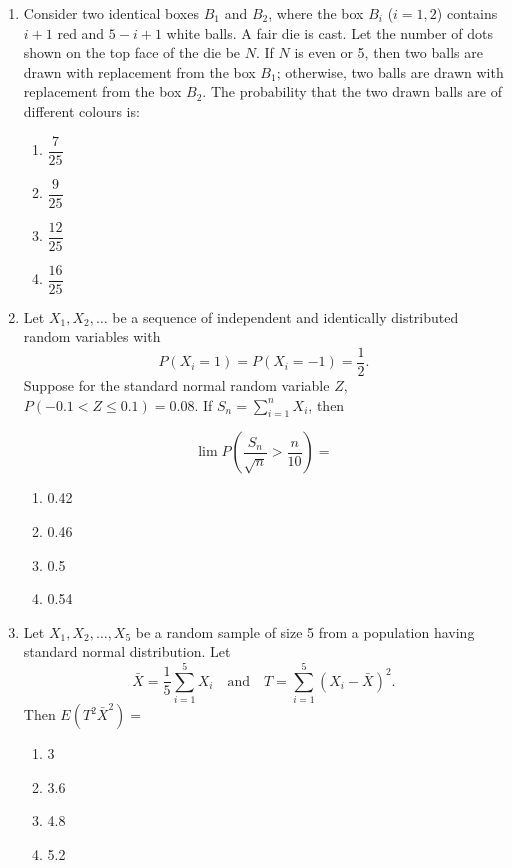 \documentclass[journal]{IEEEtran}
\numberwithin{equation}{enumi}
\numberwithin{figure}{enumi}
\begin{document}
\begin{enumerate}
\item Consider two identical boxes $B_1$ and $B_2$, where the box $B_i$ ($i=1,2$) contains $i+1$ red and $5 - i + 1$ white balls. A fair die is cast. Let the number of dots shown on the top face of the die be $N$. If $N$ is even or 5, then two balls are drawn with replacement from the box $B_1$; otherwise, two balls are drawn with replacement from the box $B_2$. The probability that the two drawn balls are of different colours is: \hfill{}
\begin{multicols}{4}
\begin{enumerate}
    \item $\dfrac{7}{25}$
    \item  $\dfrac{9}{25}$
    \item $\dfrac{12}{25}$ 
    \item  $\dfrac{16}{25}$    
\end{enumerate}
\end{multicols}
        


\item Let $X_1, X_2, \ldots$ be a sequence of independent and identically distributed random variables with    
\[
P(X_i = 1) = P(X_i = -1) = \frac{1}{2}.
\]
Suppose for the standard normal random variable $Z$, $P(-0.1 < Z \leq 0.1) = 0.08$. If $S_n = \sum_{i=1}^{n} X_i$, then

\[
\lim P\left(\frac{S_n}{\sqrt{n}} > \frac{n}{10}\right) =
\]
\begin{multicols}{4}
\begin{enumerate}
    \item 0.42
    \item 0.46
    \item 0.5
    \item 0.54  
\end{enumerate}
\end{multicols}



\item  Let $X_1, X_2, \ldots, X_5$ be a random sample of size 5 from a population having standard normal distribution. Let 
\[ 
\bar{X} = \frac{1}{5} \sum_{i=1}^{5} X_i \quad \text{and} \quad T = \sum_{i=1}^{5} (X_i - \bar{X})^2.
\]
Then $E(T^2 \bar{X}^2) =$ \hfill{}
\begin{multicols}{4}
\begin{enumerate}
    \item 3
    \item 3.6
    \item 4.8
    \item 5.2
\end{enumerate}
\end{multicols}




\end{enumerate}
\end{document}
